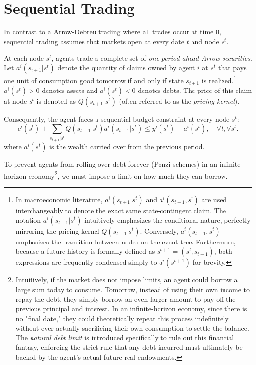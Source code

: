 \section{Sequential Trading}

In contrast to a Arrow-Debreu trading where all trades occur at time 0, sequential trading assumes that markets open at every date $t$ and node $s^t$. 

At each node $s^t$, agents trade a complete set of \textit{one-period-ahead Arrow securities}. Let $a^i(s_{t+1}|s^t)$ denote the quantity of claims owned by agent $i$ at $s^t$ that pays one unit of consumption good tomorrow if and only if state $s_{t+1}$ is realized.\footnote{
    In macroeconomic literature, $a^i(s_{t+1}|s^t)$ and $a^i(s_{t+1}, s^t)$ are used interchangeably to denote the exact same state-contingent claim. The notation $a^i(s_{t+1}|s^t)$ intuitively emphasizes the conditional nature, perfectly mirroring the pricing kernel $Q(s_{t+1}|s^t)$. Conversely, $a^i(s_{t+1}, s^t)$ emphasizes the transition between nodes on the event tree. Furthermore, because a future history is formally defined as $s^{t+1} = (s^t, s_{t+1})$, both expressions are frequently condensed simply to $a^i(s^{t+1})$ for brevity.
} $a^i(s^t)>0$ denotes assets and $a^i(s^t)<0$ denotes debts. The price of this claim at node $s^t$ is denoted as $Q(s_{t+1}|s^t)$ (often referred to as the \textit{pricing kernel}).

Consequently, the agent faces a sequential budget constraint at every node $s^t$:
\[
c^i(s^t) + \sum_{s_{t+1}|s^t} Q(s_{t+1}|s^t) a^i(s_{t+1}|s^t) \le y^i(s^t) + a^i(s^t), \quad \forall t, \forall s^t.
\]
where $a^i(s^t)$ is the wealth carried over from the previous period.

To prevent agents from rolling over debt forever (Ponzi schemes) in an infinite-horizon economy\footnote{
    Intuitively, if the market does not impose limits, an agent could borrow a large sum today to consume. Tomorrow, instead of using their own income to repay the debt, they simply borrow an even larger amount to pay off the previous principal and interest. In an infinite-horizon economy, since there is no "final date," they could theoretically repeat this process indefinitely without ever actually sacrificing their own consumption to settle the balance. The \textit{natural debt limit} is introduced specifically to rule out this financial fantasy, enforcing the strict rule that any debt incurred must ultimately be backed by the agent's actual future real endowments.
}, we must impose a limit on how much they can borrow.


